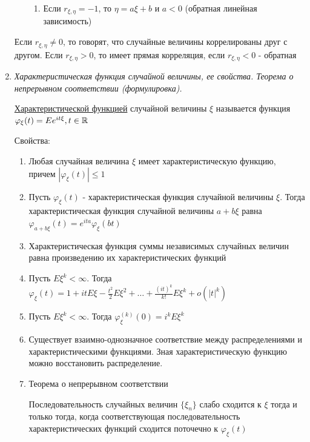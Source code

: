 \documentclass[12pt]{article}
\begin{document}
\begin{enumerate}
\begin{enumerate}
\begin{enumerate}
            \item Если $r_{\xi,\eta} = -1$, то $\eta = a\xi + b$ и $a < 0$ (обратная линейная зависимость)
        \end{enumerate}
    \end{enumerate}

    Если $r_{\xi,\eta} \neq 0$, то говорят, что случайные величины коррелированы друг с другом. Если $r_{\xi,\eta} > 0$, 
    то имеет прямая корреляция, если $r_{\xi,\eta} < 0$ - обратная

    \item \textit{Характеристическая функция случайной величины, ее свойства. Теорема о непрерывном соответствии (формулировка).}

    \hyperlink{characteristicfunction}{Характеристической функцией} случайной величины $\xi$ называется функция $\varphi_\xi(t) = Ee^{it\xi}, t \in \mathbb{R}$
    
    Свойства:

    \begin{enumerate}
        \item Любая случайная величина $\xi$ имеет характеристическую функцию, причем $|\varphi_\xi(t)| \leq 1$

        \item Пусть $\varphi_\xi(t)$ - характеристическая функция случайной величины $\xi$. Тогда характеристическая функция
        случайной величины $a + b\xi$ равна $\varphi_{a + b\xi}(t) = e^{ita} \varphi_{\xi}(bt)$

        \item Характеристическая функция суммы независимых случайных величин равна произведению их характеристических функций

        \item Пусть $E\xi^k < \infty$. Тогда $\varphi_\xi(t) = 1 + it E\xi - \frac{t^2}{2}E\xi^2 + \dots + \frac{(it)^k}{k!} E\xi^k + o(|t|^k)$

        \item Пусть $E\xi^k < \infty$. Тогда $\varphi_\xi^{(k)}(0) = i^k E\xi^k$

        \item Существует взаимно-однозначное соответствие между распределениями и характеристическими функциями.
        Зная характеристическую функцию можно восстановить распределение.

        \item Теорема о непрерывном соответствии
        
        \Ths Последовательность случайных величин $\{\xi_n\}$ слабо сходится к $\xi$ тогда и только тогда, когда
            соответствующая последовательность характеристических функций сходится поточечно к $\varphi_\xi(t)$


\end{enumerate}
\end{enumerate}
\end{document}
